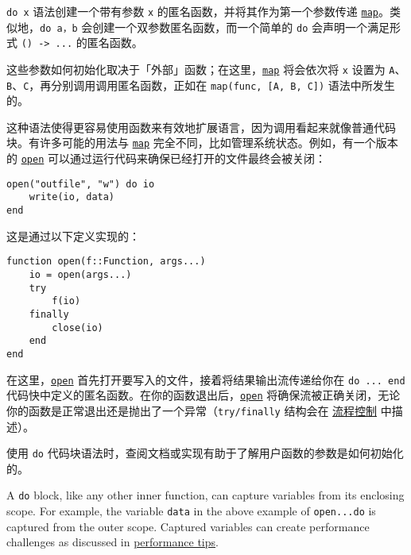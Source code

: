 \texttt{do x} 语法创建一个带有参数 \texttt{x} 的匿名函数，并将其作为第一个参数传递 \hyperlink{11483231213869150535}{\texttt{map}}。类似地，\texttt{do a，b} 会创建一个双参数匿名函数，而一个简单的 \texttt{do} 会声明一个满足形式 \texttt{() -> ...} 的匿名函数。



这些参数如何初始化取决于「外部」函数；在这里，\hyperlink{11483231213869150535}{\texttt{map}} 将会依次将 \texttt{x} 设置为 \texttt{A}、\texttt{B}、\texttt{C}，再分别调用调用匿名函数，正如在 \texttt{map(func, [A, B, C])} 语法中所发生的。



这种语法使得更容易使用函数来有效地扩展语言，因为调用看起来就像普通代码块。有许多可能的用法与 \hyperlink{11483231213869150535}{\texttt{map}} 完全不同，比如管理系统状态。例如，有一个版本的 \hyperlink{300818094931158296}{\texttt{open}} 可以通过运行代码来确保已经打开的文件最终会被关闭：




\begin{verbatim}
open("outfile", "w") do io
    write(io, data)
end
\end{verbatim}



这是通过以下定义实现的：




\begin{verbatim}
function open(f::Function, args...)
    io = open(args...)
    try
        f(io)
    finally
        close(io)
    end
end
\end{verbatim}



在这里，\hyperlink{300818094931158296}{\texttt{open}} 首先打开要写入的文件，接着将结果输出流传递给你在 \texttt{do ... end} 代码快中定义的匿名函数。在你的函数退出后，\hyperlink{300818094931158296}{\texttt{open}} 将确保流被正确关闭，无论你的函数是正常退出还是抛出了一个异常（\texttt{try/finally} 结构会在 \hyperlink{6880586223574224557}{流程控制} 中描述）。



使用 \texttt{do} 代码块语法时，查阅文档或实现有助于了解用户函数的参数是如何初始化的。



A \texttt{do} block, like any other inner function, can {\textquotedbl}capture{\textquotedbl} variables from its enclosing scope. For example, the variable \texttt{data} in the above example of \texttt{open...do} is captured from the outer scope. Captured variables can create performance challenges as discussed in \hyperlink{627547588659365489}{performance tips}.



